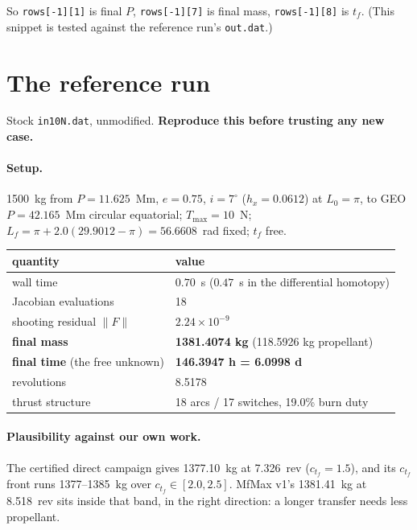 \documentclass[11pt]{article}
\newcommand{\code}[1]{\texttt{\small #1}}
\newcommand{\file}[1]{\texttt{\small #1}}
\newcommand{\Tmax}{T_{\max}}
\newcommand{\Lf}{L_f}
\begin{document}
\noindent
So \code{rows[-1][1]} is final $P$, \code{rows[-1][7]} is final mass,
\code{rows[-1][8]} is $t_f$. (This snippet is tested against the reference
run's \file{out.dat}.)

\section{The reference run}\label{sec:reference}

Stock \file{in10N.dat}, unmodified. \textbf{Reproduce this before trusting any
new case.}

\paragraph{Setup.} 1500~kg from $P = 11.625$~Mm, $e = 0.75$, $i = 7^\circ$
($h_x = 0.0612$) at $L_0 = \pi$, to GEO $P = 42.165$~Mm circular equatorial;
$\Tmax = 10$~N; $\Lf = \pi + 2.0(29.9012 - \pi) = 56.6608$~rad fixed; $t_f$
free.

\begin{center}
\begin{tabular}{@{}ll@{}}
\toprule
quantity & value\\
\midrule
wall time & $0.70$~s ($0.47$~s in the differential homotopy)\\
Jacobian evaluations & 18\\
shooting residual $\|F\|$ & $2.24\times10^{-9}$\\
\textbf{final mass} & \textbf{1381.4074 kg} (118.5926 kg propellant)\\
\textbf{final time} (the free unknown) & \textbf{146.3947 h = 6.0998 d}\\
revolutions & 8.5178\\
thrust structure & 18 arcs / 17 switches, 19.0\% burn duty\\
\bottomrule
\end{tabular}
\end{center}

\paragraph{Plausibility against our own work.} The certified direct campaign
gives 1377.10~kg at 7.326~rev ($c_{t_f} = 1.5$), and its $c_{t_f}$ front runs
1377--1385~kg over $c_{t_f} \in [2.0, 2.5]$. MfMax v1's 1381.41~kg at
8.518~rev sits inside that band, in the right direction: a longer transfer
needs less propellant.
\end{document}
